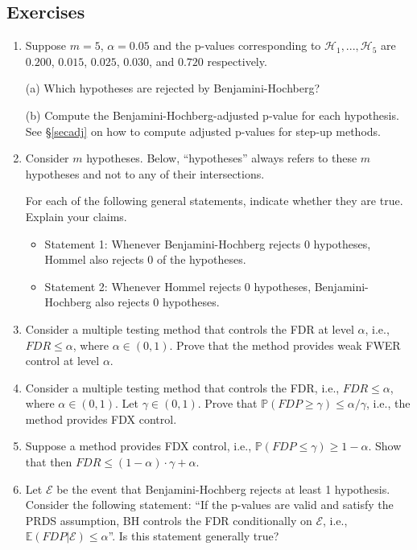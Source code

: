 \documentclass[11pt]{article}
\theoremstyle{plain}
\theoremstyle{definition}
\newcommand{\E}{\mathcal{E}}
\newcommand{\Hy}{\mathcal{H}}
\newcommand{\pr}{\mathbb{P}}
\begin{document}
\subsection{Exercises}
\begin{enumerate}

\item Suppose $m=5$, $\alpha=0.05$ and the p-values corresponding to $\Hy_1,...,\Hy_5$ are $0.200$, $0.015$, $0.025$, $0.030$,  and $0.720$ respectively.

(a) Which hypotheses are rejected by Benjamini-Hochberg?

(b) Compute the  Benjamini-Hochberg-adjusted p-value for each hypothesis. See \S\ref{secadj} on how to compute adjusted p-values for step-up methods.




\item 
Consider $m$ hypotheses. Below, ``hypotheses'' always refers to these $m$ hypotheses and not to any of their intersections.

For each of the following general statements, indicate whether they are true. Explain your claims.
\begin{itemize}
\item
Statement 1: Whenever Benjamini-Hochberg rejects 0 hypotheses, Hommel also rejects 0 of the hypotheses.
\item  Statement 2: Whenever Hommel rejects 0 hypotheses,  Benjamini-Hochberg also rejects 0 hypotheses.
\end{itemize}




\item Consider a multiple testing method that controls the FDR at level $\alpha$, i.e., $FDR\leq\alpha$, where $\alpha\in(0,1)$. Prove that the method provides weak FWER control at level $\alpha$.



\item Consider a multiple testing method that controls the FDR, i.e., $FDR\leq\alpha$, where $\alpha\in(0,1)$. Let $\gamma\in (0,1)$.
Prove that $\pr(FDP\geq \gamma) \leq \alpha/ \gamma$, i.e., the method provides FDX control.

\item Suppose a method provides FDX control, i.e., $\pr(FDP\leq \gamma) \geq 1-\alpha$. 
Show that then $FDR\leq (1-\alpha)\cdot \gamma  + \alpha$.

\item Let $\E$ be the event that Benjamini-Hochberg rejects at least 1 hypothesis. 
Consider the following statement: ``If the p-values are valid and satisfy the PRDS assumption, BH controls the FDR conditionally on $\E$, i.e., $\mathbb{E}(FDP|\E)\leq \alpha$''. Is this statement generally true?  



\end{enumerate}
\end{document}
